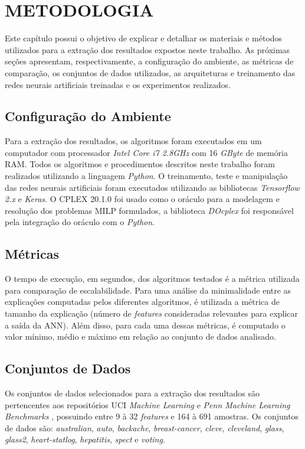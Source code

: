 \chapter{METODOLOGIA}

Este capítulo possui o objetivo de explicar e detalhar os materiais e métodos utilizados para a extração dos resultados expostos neste trabalho. As próximas seções apresentam, respectivamente, a configuração do ambiente, as métricas de comparação, os conjuntos de dados utilizados, as arquiteturas e treinamento das redes neurais artificiais treinadas e os experimentos realizados.


\section{Configuração do Ambiente}
Para a extração dos resultados, os algoritmos foram executados em um computador com processador \textit{Intel Core i7 2.8GHz} com 16 \textit{GByte} de memória RAM. Todos os algoritmos e procedimentos descritos neste trabalho foram realizados utilizando a linguagem \textit{Python}. O treinamento, teste e manipulação das redes neurais artificiais foram executados utilizando as bibliotecas \textit{Tensorflow 2.x} e \textit{Keras}. O CPLEX 20.1.0 foi usado como o oráculo para a modelagem e resolução dos problemas MILP formulados, a biblioteca \textit{DOcplex} foi responsável pela integração do oráculo com o \textit{Python}.

\section{Métricas}

O tempo de execução, em segundos, dos algoritmos testados é a métrica utilizada para comparação de escalabilidade. Para uma análise da minimalidade entre as explicações computadas pelos diferentes algoritmos, é utilizada a métrica de tamanho da explicação (número de \textit{features} consideradas relevantes para explicar a saída da ANN). Além disso, para cada uma dessas métricas, é computado o valor mínimo, médio e máximo em relação ao conjunto de dados analisado.

\section{Conjuntos de Dados}
Os conjuntos de dados selecionados para a extração dos resultados são pertencentes aos repositórios UCI \textit{Machine Learning} \cite{uci} e \textit{Penn Machine Learning Benchmarks} \cite{pennML}, possuindo entre 9 à 32 \textit{features} e 164 à 691 amostras. Os conjuntos de dados são: \textit{australian}, \textit{auto}, \textit{backache}, \textit{breast-cancer}, \textit{cleve}, \textit{cleveland}, \textit{glass}, \textit{glass2}, \textit{heart-statlog}, \textit{hepatitis}, \textit{spect} e \textit{voting}. 

